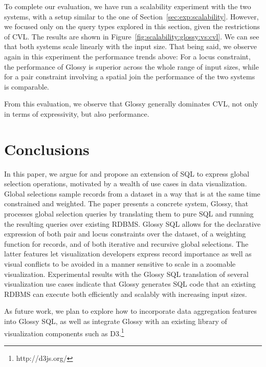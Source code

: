 \documentclass[11pt, oneside]{report}
\begin{document}
To complete our evaluation, we have run a scalability experiment with the two systems, with a setup similar to the one of Section~\ref{sec:exp:scalability}. However, we focused only on the query types explored in this section, given the restrictions of CVL. The results are shown in Figure~\ref{fig:scalability:glossy:vs:cvl}. We can see that both systems scale linearly with the input size. That being said, we observe again in this experiment the performance trends above: For a locus constraint, the performance of Glossy is superior across the whole range of input sizes, while for a pair constraint involving a spatial join the performance of the two systems is comparable. 

From this evaluation, we observe that Glossy generally dominates CVL, not only in terms of expressivity, but also performance.  


\section{Conclusions}

In this paper, we argue for and propose an extension of SQL to express global selection operations, motivated by a wealth of use cases in data visualization. Global selections sample records from a dataset in a way that is at the same time constrained and weighted. The paper presents a concrete system, Glossy, that processes global selection queries by translating them to pure SQL and running the resulting queries over existing RDBMS. Glossy SQL allows for the declarative expression of both pair and locus constraints over the dataset, of a weighting function for records, and of both iterative and recursive global selections. The latter features let visualization developers express record importance as well as visual conflicts to be avoided in a manner sensitive to scale in a zoomable visualization. Experimental results with the Glossy SQL translation of several visualization use cases indicate that Glossy generates SQL code that an existing RDBMS can execute both efficiently and scalably with increasing input sizes. 

As future work, we plan to explore how to incorporate data aggregation features into Glossy SQL, as well as integrate Glossy with an existing library of visualization components such as D3.\footnote{http://d3js.org/}
\end{document}
